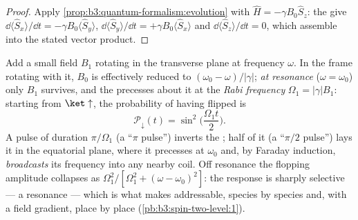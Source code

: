 \begin{proof}
Apply \cref{prop:b3:quantum-formalism:evolution} with $\hat H =
-\gamma B_0\hat S_z$: the  give $\dd\langle\hat
S_x\rangle/\dd t = -\gamma B_0\langle\hat S_y\rangle$,
$\dd\langle\hat S_y\rangle/\dd t = +\gamma B_0\langle\hat
S_x\rangle$ and $\dd\langle\hat S_z\rangle/\dd t = 0$, which
assemble into the stated vector product.
\end{proof}

\begin{proposition}\label{prop:b3:spin-two-level:rabi}
Add a small field $B_1$ rotating in the transverse plane at
frequency $\omega$. In the frame rotating with it, $B_0$ is
effectively reduced to $(\omega_0 - \omega)/|\gamma|$; \emph{at
resonance} ($\omega = \omega_0$) only $B_1$ survives, and the 
precesses about it at the \emph{Rabi frequency} $\Omega_1 =
|\gamma|B_1$: starting from $\ket\uparrow$, the probability of
having flipped is
\[
\mathcal P_\downarrow(t) = \sin^2\Big(\frac{\Omega_1t}{2}\Big) .
\]
A pulse of duration $\pi/\Omega_1$ (a ``$\pi$ pulse'') inverts the
; half of it (a ``$\pi/2$ pulse'') lays it in the equatorial
plane, where it precesses at $\omega_0$ and, by Faraday induction,
\emph{broadcasts} its frequency into any nearby coil. Off resonance
the flopping amplitude collapses as $\Omega_1^2/[\Omega_1^2 +
(\omega - \omega_0)^2]$: the response is sharply selective --- a
resonance --- which is what makes  addressable,
species by species and, with a field gradient, place by place
(\cref{pb:b3:spin-two-level:1}).
\end{proposition}
\admitted

